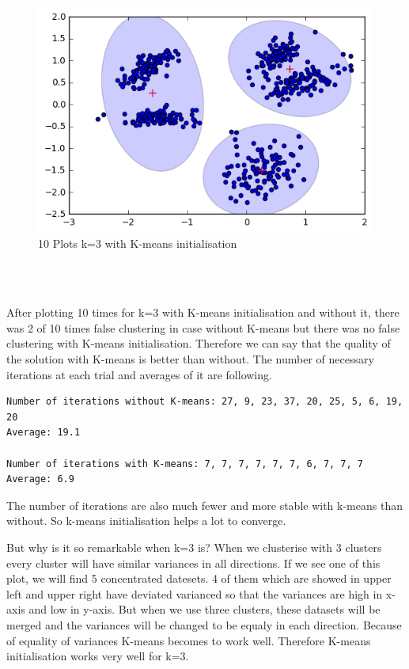 \documentclass[a4paper,11pt]{article}
\begin{document}
\begin{figure}[htbp]
  \includegraphics[scale=0.2]{k3wk10.png}
  \caption{10 Plots k=3 with K-means initialisation }
\end{figure}

\begin{verbatim}



\end{verbatim}

After plotting 10 times for k=3 with K-means initialisation and without it, there was 2 of 10 times false clustering in case without K-means but there was no false clustering with K-means initialisation. Therefore we can say that the quality of the solution with K-means is better than without.
The number of necessary iterations at each trial and averages of it are following.

\begin{verbatim}
Number of iterations without K-means: 27, 9, 23, 37, 20, 25, 5, 6, 19, 20
Average: 19.1
							  
Number of iterations with K-means: 7, 7, 7, 7, 7, 7, 6, 7, 7, 7
Average: 6.9
\end{verbatim}

The number of iterations are also much fewer and more stable with k-means than without. So k-means initialisation helps a lot to converge.

But why is it so remarkable when k=3 is? When we clusterise with 3 clusters every cluster will have similar variances in all directions. If we see one of this plot, we will find 5 concentrated datesets. 4 of them which are showed in upper left and upper right have deviated varianced so that the variances are high in x-axis and low in y-axis. But when we use three clusters, these datasets will be merged and the variances will be changed to be equaly in each direction. Because of equality of variances K-means becomes to work well. Therefore K-means initialisation works very well for k=3.
\end{document}
